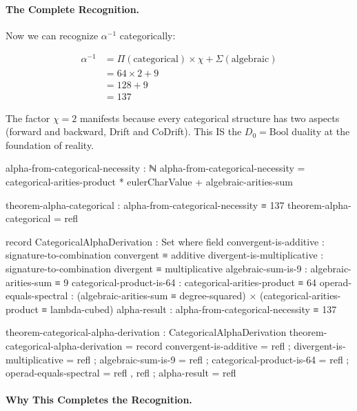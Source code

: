 \documentclass[11pt,a4paper]{book}
\begin{document}
\paragraph{The Complete Recognition.}

Now we can recognize $\alpha^{-1}$ categorically:

\begin{align*}
\alpha^{-1} &= \Pi(\text{categorical}) \times \chi + \Sigma(\text{algebraic}) \\
            &= 64 \times 2 + 9 \\
            &= 128 + 9 \\
            &= 137
\end{align*}

The factor $\chi = 2$ manifests because every categorical structure has 
two aspects (forward and backward, Drift and CoDrift). This IS the 
$D_0 = \text{Bool}$ duality at the foundation of reality.

\begin{code}
alpha-from-categorical-necessity : ℕ
alpha-from-categorical-necessity = categorical-arities-product * eulerCharValue + algebraic-arities-sum

theorem-alpha-categorical : alpha-from-categorical-necessity ≡ 137
theorem-alpha-categorical = refl

record CategoricalAlphaDerivation : Set where
  field
    convergent-is-additive    : signature-to-combination convergent ≡ additive
    divergent-is-multiplicative : signature-to-combination divergent ≡ multiplicative
    algebraic-sum-is-9        : algebraic-arities-sum ≡ 9
    categorical-product-is-64 : categorical-arities-product ≡ 64
    operad-equals-spectral    : (algebraic-arities-sum ≡ degree-squared) × 
                                (categorical-arities-product ≡ lambda-cubed)
    alpha-result              : alpha-from-categorical-necessity ≡ 137

theorem-categorical-alpha-derivation : CategoricalAlphaDerivation
theorem-categorical-alpha-derivation = record
  { convergent-is-additive      = refl
  ; divergent-is-multiplicative = refl
  ; algebraic-sum-is-9          = refl
  ; categorical-product-is-64   = refl
  ; operad-equals-spectral      = refl , refl
  ; alpha-result                = refl
  }
\end{code}

\paragraph{Why This Completes the Recognition.}
\end{document}
